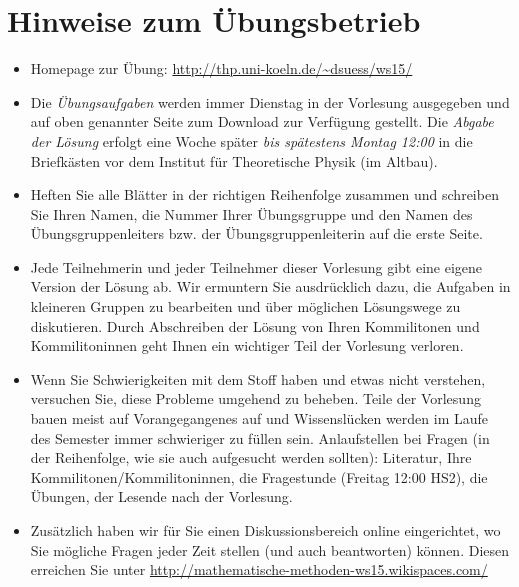 \documentclass[11pt]{scrartcl}
\begin{document}
\maketitle

\section*{Hinweise zum Übungsbetrieb}
\begin{itemize}
  \item Homepage zur Übung: \url{http://thp.uni-koeln.de/~dsuess/ws15/}
  \item Die \emph{Übungsaufgaben} werden immer Dienstag in der Vorlesung ausgegeben und auf oben genannter Seite zum Download zur Verfügung gestellt. Die \emph{Abgabe der Lösung} erfolgt eine Woche später \emph{bis spätestens Montag 12:00} in die Briefkästen vor dem Institut für Theoretische Physik (im Altbau).
  \item Heften Sie alle Blätter in der richtigen Reihenfolge zusammen und schreiben Sie Ihren Namen, die Nummer Ihrer Übungsgruppe und den Namen des Übungsgruppenleiters bzw. der Übungsgruppenleiterin auf die erste Seite. 
  \item Jede Teilnehmerin und jeder Teilnehmer dieser Vorlesung gibt eine eigene Version der Lösung ab. Wir ermuntern Sie ausdrücklich dazu, die Aufgaben in kleineren Gruppen zu bearbeiten und über möglichen Lösungswege zu diskutieren. Durch Abschreiben der Lösung von Ihren Kommilitonen und Kommilitoninnen geht Ihnen ein wichtiger Teil der Vorlesung verloren.
  \item Wenn Sie Schwierigkeiten mit dem Stoff haben und etwas nicht verstehen, versuchen Sie, diese Probleme umgehend zu beheben. Teile der Vorlesung bauen meist auf Vorangegangenes auf und Wissenslücken werden im Laufe des Semester immer schwieriger zu füllen sein. Anlaufstellen bei Fragen (in der Reihenfolge, wie sie auch aufgesucht werden sollten): Literatur, Ihre Kommilitonen/Kommilitoninnen, die Fragestunde (Freitag 12:00 HS2), die Übungen, der Lesende nach der Vorlesung.
  \item Zusätzlich haben wir für Sie einen Diskussionsbereich online eingerichtet, wo Sie mögliche Fragen jeder Zeit stellen (und auch beantworten) können. Diesen erreichen Sie unter \url{http://mathematische-methoden-ws15.wikispaces.com/}
\end{itemize}
\end{document}
